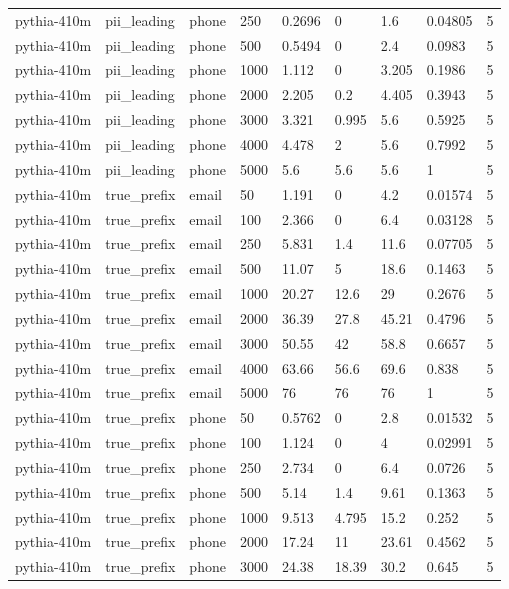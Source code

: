 \begin{tabular}{lllllllll}
pythia-410m & pii\_leading & phone & 250 & 0.2696 & 0 & 1.6 & 0.04805 & 5 \\
pythia-410m & pii\_leading & phone & 500 & 0.5494 & 0 & 2.4 & 0.0983 & 5 \\
pythia-410m & pii\_leading & phone & 1000 & 1.112 & 0 & 3.205 & 0.1986 & 5 \\
pythia-410m & pii\_leading & phone & 2000 & 2.205 & 0.2 & 4.405 & 0.3943 & 5 \\
pythia-410m & pii\_leading & phone & 3000 & 3.321 & 0.995 & 5.6 & 0.5925 & 5 \\
pythia-410m & pii\_leading & phone & 4000 & 4.478 & 2 & 5.6 & 0.7992 & 5 \\
pythia-410m & pii\_leading & phone & 5000 & 5.6 & 5.6 & 5.6 & 1 & 5 \\
pythia-410m & true\_prefix & email & 50 & 1.191 & 0 & 4.2 & 0.01574 & 5 \\
pythia-410m & true\_prefix & email & 100 & 2.366 & 0 & 6.4 & 0.03128 & 5 \\
pythia-410m & true\_prefix & email & 250 & 5.831 & 1.4 & 11.6 & 0.07705 & 5 \\
pythia-410m & true\_prefix & email & 500 & 11.07 & 5 & 18.6 & 0.1463 & 5 \\
pythia-410m & true\_prefix & email & 1000 & 20.27 & 12.6 & 29 & 0.2676 & 5 \\
pythia-410m & true\_prefix & email & 2000 & 36.39 & 27.8 & 45.21 & 0.4796 & 5 \\
pythia-410m & true\_prefix & email & 3000 & 50.55 & 42 & 58.8 & 0.6657 & 5 \\
pythia-410m & true\_prefix & email & 4000 & 63.66 & 56.6 & 69.6 & 0.838 & 5 \\
pythia-410m & true\_prefix & email & 5000 & 76 & 76 & 76 & 1 & 5 \\
pythia-410m & true\_prefix & phone & 50 & 0.5762 & 0 & 2.8 & 0.01532 & 5 \\
pythia-410m & true\_prefix & phone & 100 & 1.124 & 0 & 4 & 0.02991 & 5 \\
pythia-410m & true\_prefix & phone & 250 & 2.734 & 0 & 6.4 & 0.0726 & 5 \\
pythia-410m & true\_prefix & phone & 500 & 5.14 & 1.4 & 9.61 & 0.1363 & 5 \\
pythia-410m & true\_prefix & phone & 1000 & 9.513 & 4.795 & 15.2 & 0.252 & 5 \\
pythia-410m & true\_prefix & phone & 2000 & 17.24 & 11 & 23.61 & 0.4562 & 5 \\
pythia-410m & true\_prefix & phone & 3000 & 24.38 & 18.39 & 30.2 & 0.645 & 5 \\

\end{tabular}
